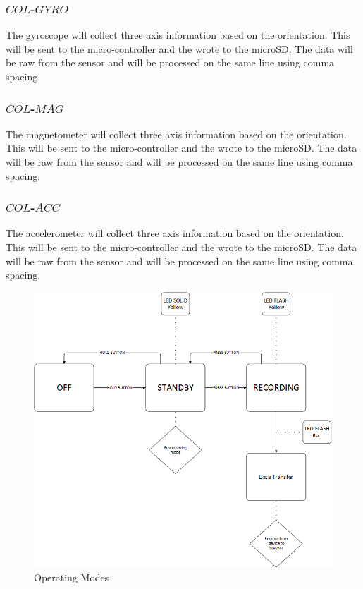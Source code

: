 \documentclass{report}
\begin{document}
\subsubsection{$COL$-$GYRO$}
The gyroscope will collect three axis information based on the orientation. This will be sent to the micro-controller and the wrote to the microSD. The data will be raw from the sensor and will be processed on the same line using comma spacing.\\
\subsubsection{$COL$-$MAG$}
The magnetometer will collect three axis information based on the orientation. This will be sent to the micro-controller and the wrote to the microSD. The data will be raw from the sensor and will be processed on the same line using comma spacing.\\
\subsubsection{$COL$-$ACC$}
The accelerometer will collect three axis information based on the orientation. This will be sent to the micro-controller and the wrote to the microSD. The data will be raw from the sensor and will be processed on the same line using comma spacing.\\



\begin{figure}[ht!]
\centering
\includegraphics[width=115mm]{ImageFlow.png}
\caption{Operating Modes}
\label{overflow}
\end{figure}
\end{document}

